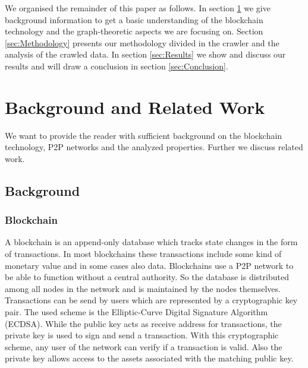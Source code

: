 \documentclass[10pt,conference,final]{IEEEtran}
\begin{document}
We organised the remainder of this paper as follows.
In section \ref{sec:BaR} we give background information to get a basic understanding of the blockchain technology and the graph-theoretic aspects we are focusing on.
Section \ref{sec:Methodology} presents our methodology divided in the crawler and the analysis of the crawled data.
In section \ref{sec:Results} we show and discuss our results and will draw a conclusion in section \ref{sec:Conclusion}.

\vspace{2mm}

\section{Background and Related Work}
\label{sec:BaR}
We want to provide the reader with sufficient background on the blockchain technology, P2P networks and the analyzed properties.
Further we discuss related work.

\vspace{2mm}

\subsection{Background}
\label{sec:Background}

\vspace{2mm}

\subsubsection{Blockchain}
\label{sec:Blockchain}
A blockchain is an append-only database which tracks state changes in the form of transactions.
In most blockchains these transactions include some kind of monetary value and in some cases also data.
Blockchains use a P2P network to be able to function without a central authority.
So the database is distributed among all nodes in the network and is maintained by the nodes themselves.
Transactions can be send by users which are represented by a cryptographic key pair.
The used scheme is the Elliptic-Curve Digital Signature Algorithm (ECDSA).
While the public key acts as receive address for transactions, the private key is used to sign and send a transaction.
With this cryptographic scheme, any user of the network can verify if a transaction is valid.
Also the private key allows access to the assets associated with the matching public key.
\end{document}
